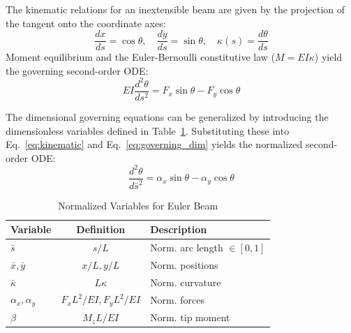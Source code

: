 \documentclass[colorlinks,upint,subscriptcorrection,varvw,hyphenate,balance]{asmeconf} %
\newcommand{\xbar}{\bar{x}}
\newcommand{\ybar}{\bar{y}}
\newcommand{\sbar}{\bar{s}}
\newcommand{\kbar}{\bar{\kappa}}
\begin{document}
The kinematic relations for an inextensible beam are given by the projection of the tangent onto the coordinate axes:
\begin{equation}
\frac{dx}{ds} = \cos\theta, \quad \frac{dy}{ds} = \sin\theta, \quad \kappa(s) = \frac{d\theta}{ds}
\label{eq:kinematic}
\end{equation}
Moment equilibrium and the Euler-Bernoulli constitutive law ($M = EI\kappa$) yield the governing second-order ODE:
\begin{equation}
EI \frac{d^2\theta}{ds^2} = F_x \sin\theta - F_y \cos\theta
\label{eq:governing_dim}
\end{equation}

The dimensional governing equations can be generalized by introducing the dimensionless variables defined in Table~\ref{tab:normalization}. Substituting these into Eq.~\eqref{eq:kinematic} and Eq.~\eqref{eq:governing_dim} yields the normalized second-order ODE:
\begin{equation}
\frac{d^2\theta}{d\sbar^2} = \alpha_x \sin\theta - \alpha_y \cos\theta
\label{eq:normalized_ode}
\end{equation}

\begin{table}[ht]
\centering
\caption{Normalized Variables for Euler Beam}
\label{tab:normalization}
\begin{tabular}{lcl}
\toprule
\textbf{Variable} & \textbf{Definition} & \textbf{Description} \\
\midrule
$\sbar$ & $s/L$ & Norm. arc length $\in [0,1]$ \\
$\xbar, \ybar$ & $x/L, y/L$ & Norm. positions \\
$\kbar$ & $L\kappa$ & Norm. curvature \\
$\alpha_x, \alpha_y$ & $F_x L^2 / EI, F_y L^2 / EI$ & Norm. forces \\
$\beta$ & $M_z L / EI$ & Norm. tip moment \\
\bottomrule
\end{tabular}
\end{table}
\end{document}
